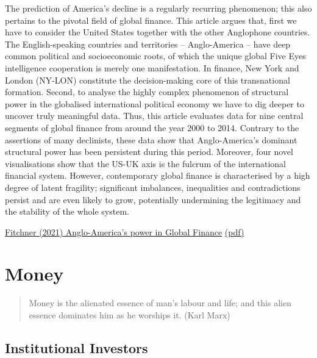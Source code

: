 \documentclass[
]{book}
\begin{document}
The prediction of America's decline is a regularly recurring phenomenon; this also pertains to the
pivotal field of global finance. This article argues that, first we have to consider the United States
together with the other Anglophone countries. The English-speaking countries and territories --
Anglo-America -- have deep common political and socioeconomic roots, of which the unique global Five
Eyes intelligence cooperation is merely one manifestation. In finance, New York and London
(NY-LON) constitute the decision-making core of this transnational formation. Second, to analyse the
highly complex phenomenon of structural power in the globalised international political economy we
have to dig deeper to uncover truly meaningful data. Thus, this article evaluates data for nine central
segments of global finance from around the year 2000 to 2014. Contrary to the assertions of many
declinists, these data show that Anglo-America's dominant structural power has been persistent during
this period. Moreover, four novel visualisations show that the US-UK axis is the fulcrum of the
international financial system. However, contemporary global finance is characterised by a high degree
of latent fragility; significant imbalances, inequalities and contradictions persist and are even likely to
grow, potentially undermining the legitimacy and the stability of the whole system.

\href{https://www.cambridge.org/core/journals/review-of-international-studies/article/perpetual-decline-or-persistent-dominance-uncovering-angloamericas-true-structural-power-in-global-finance/75536FC7435F72FC9AB4968D0509F019}{Fitchner (2021) Anglo-America's power in Global Finance}
\href{pdf/Fitchner_2021_anglo-americas-power-in-global-finance.pdf}{(pdf)}

\hypertarget{money}{%
\section{Money}\label{money}}

\begin{quote}
Money is the alienated essence of man's labour and life; and this alien essence dominates him as he worships it. (Karl Marx)
\end{quote}

\hypertarget{institutional-investors}{%
\subsection{Institutional Investors}\label{institutional-investors}}
\end{document}
